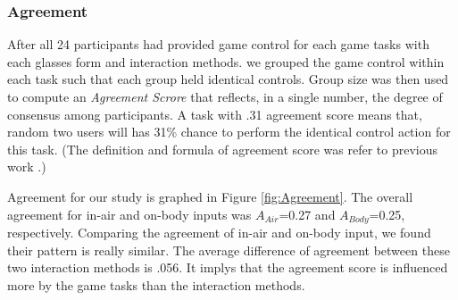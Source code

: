 \documentclass{sigchi}
\begin{document}
   \subsubsection{Agreement}
   After all 24 participants had provided game control for each game tasks with each glasses form and interaction methods. we grouped the game control within each task such that each group held identical controls. Group size was then used to compute an \emph{Agreement Scrore} that reflects, in a single number, the degree of consensus among participants. A task with .31 agreement score means that, random two users will has 31\% chance to perform the identical control action for this task. (The definition and formula of agreement score was refer to previous work \cite{Wobbrock:2005:MGS:1056808.1057043}.)

   Agreement for our study is graphed in Figure \ref{fig:Agreement}. The overall agreement for in-air and on-body inputs was $A_{Air}$=0.27 and $A_{Body}$=0.25, respectively. Comparing the agreement of in-air and on-body input, we found their pattern is really similar. The average difference of agreement between these two interaction methods is .056. It implys that the agreement score is influenced more by the game tasks than the interaction methods.
\end{document}
